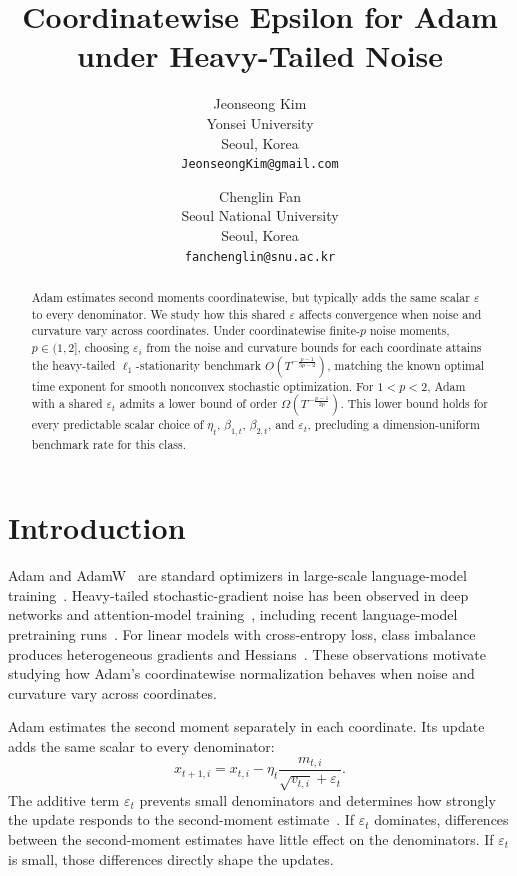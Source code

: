\documentclass[11pt,letterpaper]{article}
\title{Coordinatewise Epsilon for Adam\\under Heavy-Tailed Noise}
\author{
Jeonseong Kim\\
Yonsei University\\
Seoul, Korea\\
\texttt{JeonseongKim@gmail.com}
\and
Chenglin Fan\\
Seoul National University\\
Seoul, Korea\\
\texttt{fanchenglin@snu.ac.kr}
}
\date{}
\theoremstyle{definition}
\newcommand{\eps}{\varepsilon}
\begin{document}
\maketitle
\pagestyle{plain}
\thispagestyle{plain}

\begin{abstract}
Adam estimates second moments coordinatewise, but typically adds the same scalar $\eps$ to every denominator. We study how this shared $\eps$ affects convergence when noise and curvature vary across coordinates. Under coordinatewise finite-$p$ noise moments, $p\in(1,2]$, choosing $\eps_i$ from the noise and curvature bounds for each coordinate attains the heavy-tailed $\ell_1$-stationarity benchmark $O(T^{-\frac{p-1}{3p-2}})$, matching the known optimal time exponent for smooth nonconvex stochastic optimization. For $1<p<2$, Adam with a shared $\eps_t$ admits a lower bound of order $\Omega(T^{-\frac{p-1}{2p}})$. This lower bound holds for every predictable scalar choice of $\eta_t$, $\beta_{1,t}$, $\beta_{2,t}$, and $\eps_t$, precluding a dimension-uniform benchmark rate for this class.
\end{abstract}

\section{Introduction}

Adam and AdamW~\citep{kingma2015adam,loshchilov2019decoupled} are standard optimizers in large-scale language-model training~\citep{brown2020language,touvron2023llama}. Heavy-tailed stochastic-gradient noise has been observed in deep networks and attention-model training~\citep{simsekli2019tail,zhang2020attention}, including recent language-model pretraining runs~\citep{yu2026sign}. For linear models with cross-entropy loss, class imbalance produces heterogeneous gradients and Hessians~\citep{kunstner2024class}. These observations motivate studying how Adam's coordinatewise normalization behaves when noise and curvature vary across coordinates.

Adam estimates the second moment separately in each coordinate. Its update adds the same scalar to every denominator:
\[
x_{t+1,i}=x_{t,i}-\eta_t
\frac{m_{t,i}}{\sqrt{v_{t,i}}+\eps_t}.
\]
The additive term $\eps_t$ prevents small denominators and determines how strongly the update responds to the second-moment estimate~\citep{zaheer2018adaptive,tong2022calibrating}. If $\eps_t$ dominates, differences between the second-moment estimates have little effect on the denominators. If $\eps_t$ is small, those differences directly shape the updates.
\end{document}

